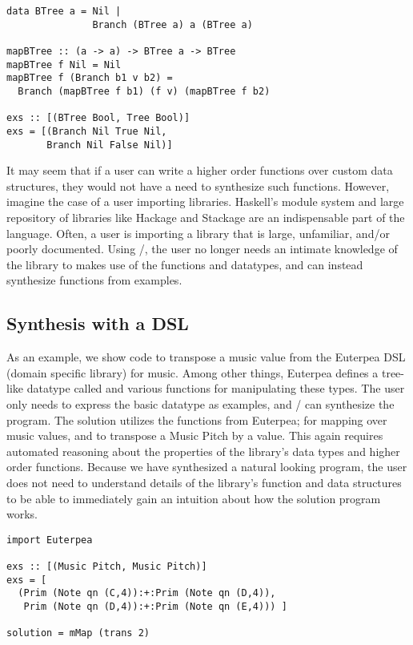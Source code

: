 \begin{lstlisting}
data BTree a = Nil |
               Branch (BTree a) a (BTree a)

mapBTree :: (a -> a) -> BTree a -> BTree 
mapBTree f Nil = Nil
mapBTree f (Branch b1 v b2) = 
  Branch (mapBTree f b1) (f v) (mapBTree f b2)

exs :: [(BTree Bool, Tree Bool)]
exs = [(Branch Nil True Nil,
       Branch Nil False Nil)]
\end{lstlisting}

It may seem that if a user can write a higher order functions over custom data structures, they would not have a need to synthesize such functions.
However, imagine the case of a user importing libraries.
Haskell's module system and large repository of libraries like Hackage and Stackage are an indispensable part of the language\cite{hackage,stackage}.
Often, a user is importing a library that is large, unfamiliar, and/or poorly documented.
Using \ourTool/, the user no longer needs an intimate knowledge of the library to makes use of the functions and datatypes, and can instead synthesize functions from examples.


\subsection{Synthesis with a DSL}

As an example, we show code to transpose a music value from the Euterpea DSL (domain specific library) for music\cite{euterpea}.
Among other things, Euterpea defines a tree-like datatype called  and various functions for manipulating these types.
The user only needs to express the basic datatype as examples, and \ourTool/ can synthesize the  program.
The solution utilizes the functions from Euterpea;  for mapping over music values, and  to transpose a Music Pitch by a value.
This again requires automated reasoning about the properties of the library's data types and higher order functions.
Because we have synthesized a natural looking program, the user does not need to understand details of the library's function and data structures to be able to immediately gain an intuition about how the solution program works.

\begin{lstlisting}
import Euterpea

exs :: [(Music Pitch, Music Pitch)]
exs = [
  (Prim (Note qn (C,4)):+:Prim (Note qn (D,4)),
   Prim (Note qn (D,4)):+:Prim (Note qn (E,4))) ]
        
solution = mMap (trans 2)
\end{lstlisting}

